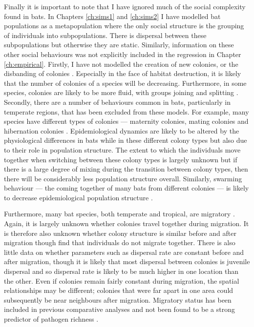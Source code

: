 Finally it is important to note that I have ignored much of the social complexity found in bats.
In Chapters \ref{ch:sims1} and \ref{ch:sims2} I have modelled bat populations as a metapopulation where the only social structure is the grouping of individuals into subpopulations.
There is dispersal between these subpopulations but otherwise they are static.
Similarly, information on these other social behaviours was not explicitly included in the regression in Chapter \ref{ch:empirical}.
Firstly, I have not modelled the creation of new colonies, or the disbanding of colonies \cite{metheny2008genetic}.
Especially in the face of habitat destruction, it is likely that the number of colonies of a species will be decreasing.
Furthermore, in some species, colonies are likely to be more fluid, with groups joining and splitting \cite{kerth2012causes, august2014sympatric}.
Secondly, there are a number of behaviours common in bats, particularly in temperate regions, that has been excluded from these models.
For example, many species have different types of colonies --- maternity colonies, mating colonies and hibernation colonies \cite{kerth2008causes}.
Epidemiological dynamics are likely to be altered by the physiological differences in bats while in these different colony types \cite{george2011host, langwig2015host, blehert2012fungal} but also due to their role in population structure.
The extent to which the individuals move together when switching between these colony types is largely unknown \cite{kurta2002philopatry} but if there is a large degree of mixing during the transition between colony types, then there will be considerably less population structure overall.
Similarly, swarming behaviour --- the coming together of many bats from different colonies --- is likely to decrease epidemiological population structure \cite{kerth2012causes}.


Furthermore, many bat species, both temperate and tropical, are migratory \cite{fleming2003ecology, krauel2013recent, popa2009bats, hutterer2005bat}.
Again, it is largely unknown whether colonies travel together during migration. 
It is therefore also unknown whether colony structure is similar before and after migration \cite{carter2013cooperation} though \textcite{kurta2002philopatry} find that individuals do not migrate together.
There is also little data on whether parameters such as dispersal rate are constant before and after migration, though it is likely that most dispersal between colonies is juvenile dispersal and so dispersal rate is likely to be much higher in one location than the other.
Even if colonies remain fairly constant during migration, the spatial relationships may be different; colonies that were far apart in one area could subsequently be near neighbours after migration.
Migratory status has been included in previous comparative analyses and not been found to be a strong predictor of pathogen richness \cite{turmelle2009correlates, maganga2014bat}. 

